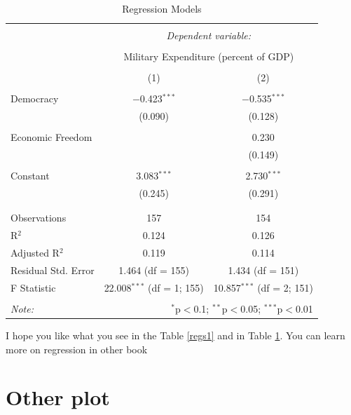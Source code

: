 \documentclass[11pt]{article}
\begin{document}
\begin{table}[!htbp] \centering 
  \caption{Regression Models} 
  \label{regs2} 
\begin{tabular}{@{\extracolsep{5pt}}lcc} 
\\[-1.8ex]\hline 
\hline \\[-1.8ex] 
 & \multicolumn{2}{c}{\textit{Dependent variable:}} \\ 
\cline{2-3} 
\\[-1.8ex] & \multicolumn{2}{c}{Military Expenditure (percent of GDP)} \\ 
\\[-1.8ex] & (1) & (2)\\ 
\hline \\[-1.8ex] 
 Democracy & $-$0.423$^{***}$ & $-$0.535$^{***}$ \\ 
  & (0.090) & (0.128) \\ 
  & & \\ 
 Economic Freedom &  & 0.230 \\ 
  &  & (0.149) \\ 
  & & \\ 
 Constant & 3.083$^{***}$ & 2.730$^{***}$ \\ 
  & (0.245) & (0.291) \\ 
  & & \\ 
\hline \\[-1.8ex] 
Observations & 157 & 154 \\ 
R$^{2}$ & 0.124 & 0.126 \\ 
Adjusted R$^{2}$ & 0.119 & 0.114 \\ 
Residual Std. Error & 1.464 (df = 155) & 1.434 (df = 151) \\ 
F Statistic & 22.008$^{***}$ (df = 1; 155) & 10.857$^{***}$ (df = 2; 151) \\ 
\hline 
\hline \\[-1.8ex] 
\textit{Note:}  & \multicolumn{2}{r}{$^{*}$p$<$0.1; $^{**}$p$<$0.05; $^{***}$p$<$0.01} \\ 
\end{tabular} 
\end{table} 
I hope you like what you see in the Table \ref{regs1} and in Table \ref{regs2}. You can learn more on regression in other book \citep[150-160]{petrie_introduction_2016}



\section{Other plot}\label{otherPlots}
\end{document}
